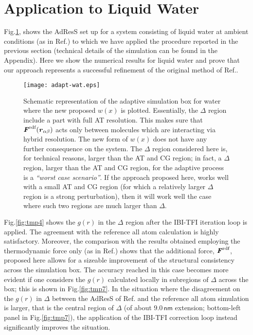 \documentclass[aps,pre,preprint]{revtex4}
\renewcommand{\v}[1]{\textbf{\textit{#1}}}
\begin{document}
\section{Application to Liquid Water}
Fig.\ref{adapt-wat}, shows the AdResS set up for a system consisting of liquid water at ambient conditions (as in Ref.\cite{prlgc}) to which we have applied the procedure reported in the previous section (technical details of the simulation can be found in the Appendix). Here we show the numerical results for liquid water and prove that our approach represents a successful refinement of the original method of Ref.\cite{prlgc}. 
\begin{figure}
  \centering
  \texttt{[image: adapt-wat.eps]}
  \caption{Schematic representation of the adaptive simulation box for water where the new proposed $w(x)$ is plotted. Essentially, the $\Delta$ region include a part with full AT resolution. This makes sure that $\v F^{\textrm{rdf}}(\v r_{\alpha\beta})$ acts only between molecules which are interacting via hybrid resolution. The new form of $w(x)$ does not have any further consequence on the system. The $\Delta$ region considered here is, for technical reasons, larger than the AT and CG region; in fact, a $\Delta$ region, larger than the AT and CG region, for the adaptive process is a {\it ``worst case scenario''}. If the approach proposed here, works well with a small AT and CG region (for which a relatively larger $\Delta$ region is a strong perturbation), then it will work well the case where such two regions are much larger than $\Delta$.}
  \label{adapt-wat}
\end{figure}
Fig.\ref{fig:tmp4} shows the $g(r)$ in the $\Delta$ region after the IBI-TFI iteration loop is applied. The agreement with the reference all atom calculation is highly satisfactory. Moreover, the comparison with the results obtained employing the thermodynamic force only (as in Ref.\cite{prlgc}) shows that the additional force, $\v F^{\textrm{rdf}}$, proposed here allows for a sizeable improvement of the structural consistency across the simulation box. The accuracy reached in this case becomes more evident if one considers the $g(r)$ calculated locally in subregions of $\Delta$ across the box; this is shown in Fig.\ref{fig:tmp7}. In the situation where the disagreement on the $g(r)$ in $\Delta$ between the AdResS of Ref.\cite{prlgc} and the reference all atom simulation is larger, that is the central region of $\Delta$ (of about $9.0\, \textsf{nm}$ extension; bottom-left panel in Fig.\ref{fig:tmp7}), the application of the  IBI-TFI correction loop instead significantly improves the situation. 
\end{document}
